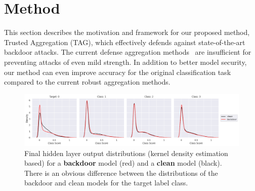 \documentclass{article} %
\newtheorem{definition}{Definition}
\begin{document}



%
\vspace{-10pt}
\section{Method}
\vspace{-10pt}

This section describes the motivation and framework for our proposed method, Trusted Aggregation (TAG), which effectively defends against state-of-the-art backdoor attacks. The current defense aggregation methods~\citep[e.g.,][]{fedavg,trim-mean} are insufficient for preventing attacks of even mild strength. In addition to better model security, our method can even improve accuracy for the original classification task compared to the current robust aggregation methods.

\begin{figure}[H]
\vspace{-10pt}
    \centering
    \includegraphics[width=\textwidth]{make_article/make_visuals/visuals/ext_motivation.png}
    \vspace{-10pt}
    \caption{\footnotesize Final hidden layer output distributions (kernel density estimation based) for a {\color{red}\bf backdoor} model (red) and a {\bf clean} model (black). There is an obvious difference between the distributions of the backdoor and clean models for the target label class.}
    \label{fig: motivation}
    \vspace{-10pt}
\end{figure}
\end{document}
